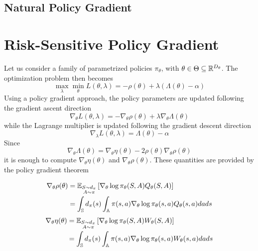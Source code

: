 \subsection{Natural Policy Gradient}




\section{Risk-Sensitive Policy Gradient}
Let us consider a family of parametrized policies $\pi_\theta$, with $\theta
\in \Theta \subseteq \R^{D_\theta}$. The optimization problem then becomes
\begin{equation}
	\max_\lambda \min_\theta L(\theta, \lambda) = - \rho(\theta) + \lambda
	(\Lambda(\theta) - \alpha)
\end{equation}
Using a policy gradient approach, the policy parameters are updated following 
the gradient ascent direction
\begin{equation}
	\nabla_\theta L(\theta, \lambda) = - \nabla_\theta \rho(\theta) + \lambda
	\nabla_\theta \Lambda(\theta)
\end{equation}
while the Lagrange multiplier is updated following the gradient descent
direction  
\begin{equation}
	\nabla_\lambda L(\theta, \lambda) = \Lambda(\theta) - \alpha
\end{equation}
Since 
\begin{equation}
	\nabla_\theta \Lambda(\theta) = \nabla_\theta \eta(\theta) - 2 \rho(\theta)
	\nabla_\theta \rho(\theta)
\end{equation}
it is enough to compute $\nabla_\theta \eta(\theta)$ and $\nabla_\theta
\rho(\theta)$. These quantities are provided by the policy gradient theorem 
\begin{theorem}
	\begin{equation}\label{eq:policy_gradient_theorem_Q}
		\begin{split}
			\nabla_\theta \rho(\theta) &= \E[\substack{S\sim d_\pi \\ 
			A \sim \pi}]{\nabla_\theta \log \pi_\theta(S,A) Q_\theta(S,A)}\\
			&= \int_\S d_\pi(s) \int_\A \pi(s,a) \nabla_\theta \log
			\pi_\theta(s,a) Q_\theta(s,a) da ds	
		\end{split}
	\end{equation}
	\begin{equation}\label{eq:policy_gradient_theorem_W}
		\begin{split}
			\nabla_\theta \eta(\theta) &= \E[\substack{S\sim d_\pi \\ 
			A \sim \pi}]{\nabla_\theta \log \pi_\theta(S,A) W_\theta(S,A)}\\
			&= \int_\S d_\pi(s) \int_\A \pi(s,a) \nabla_\theta \log
			\pi_\theta(s,a) W_\theta(s,a) da ds	
		\end{split}
	\end{equation}
\end{theorem}
